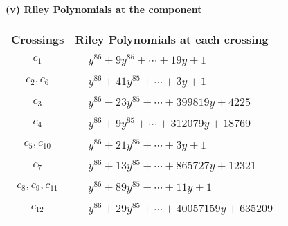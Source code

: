\documentclass[1p]{elsarticle_modified}
\theoremstyle{definition}
\begin{document}
\newpage\renewcommand{\arraystretch}{1}
\flushleft \textbf{(v) Riley Polynomials at the component}\newline \\
\begin{tabular}{m{50pt}|m{274pt}}
Crossings & \hspace{64pt}Riley Polynomials at each crossing \\
\hline $$\begin{aligned}c_{1}\end{aligned}$$&$\begin{aligned}
&y^{86}+9 y^{85}+\cdots+19 y+1
\end{aligned}$\\
\hline $$\begin{aligned}c_{2},c_{6}\end{aligned}$$&$\begin{aligned}
&y^{86}+41 y^{85}+\cdots+3 y+1
\end{aligned}$\\
\hline $$\begin{aligned}c_{3}\end{aligned}$$&$\begin{aligned}
&y^{86}-23 y^{85}+\cdots+399819 y+4225
\end{aligned}$\\
\hline $$\begin{aligned}c_{4}\end{aligned}$$&$\begin{aligned}
&y^{86}+9 y^{85}+\cdots+312079 y+18769
\end{aligned}$\\
\hline $$\begin{aligned}c_{5},c_{10}\end{aligned}$$&$\begin{aligned}
&y^{86}+21 y^{85}+\cdots+3 y+1
\end{aligned}$\\
\hline $$\begin{aligned}c_{7}\end{aligned}$$&$\begin{aligned}
&y^{86}+13 y^{85}+\cdots+865727 y+12321
\end{aligned}$\\
\hline $$\begin{aligned}c_{8},c_{9},c_{11}\end{aligned}$$&$\begin{aligned}
&y^{86}+89 y^{85}+\cdots+11 y+1
\end{aligned}$\\
\hline $$\begin{aligned}c_{12}\end{aligned}$$&$\begin{aligned}
&y^{86}+29 y^{85}+\cdots+40057159 y+635209
\end{aligned}$\\
\hline
\end{tabular}\\~\\
\end{document}

